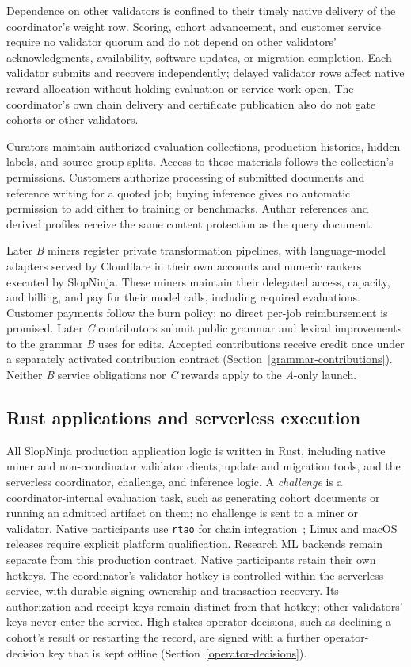 Dependence on other validators is confined to their timely native delivery of
the coordinator's weight row. Scoring, cohort advancement, and customer service require no validator
quorum and do not depend on other validators' acknowledgments, availability,
software updates, or migration completion. Each validator submits and recovers
independently; delayed validator rows affect native reward allocation
without holding evaluation or service work open. The coordinator's own chain
delivery and certificate publication also do not gate cohorts or other validators.

Curators maintain authorized evaluation collections, production histories,
hidden labels, and source-group splits. Access to these materials follows the
collection's permissions. Customers authorize processing of submitted documents
and reference writing for a quoted job; buying inference gives no automatic
permission to add either to training or benchmarks. Author references and
derived profiles receive the same content protection as the query document.

Later \textit{B} miners register private transformation pipelines, with
language-model adapters served by Cloudflare in their own accounts and numeric
rankers executed by SlopNinja. These miners maintain their delegated access,
capacity, and billing, and pay for their model calls, including required
evaluations. Customer payments follow the burn policy; no direct per-job
reimbursement is promised. Later \textit{C} contributors submit public grammar
and lexical improvements to the grammar \textit{B} uses for edits. Accepted
contributions receive credit once under a separately activated contribution
contract (Section~\ref{grammar-contributions}). Neither \textit{B} service obligations nor \textit{C} rewards apply to the
\textit{A}-only launch.

\subsection{Rust applications and serverless execution}

All SlopNinja production application logic is written in Rust, including
native miner and non-coordinator validator clients, update and migration tools,
and the serverless coordinator, challenge, and inference logic. A \emph{challenge}
is a coordinator-internal evaluation task, such as generating cohort documents
or running an admitted artifact on them; no challenge is sent to a miner or
validator. Native participants use
\texttt{rtao} for chain integration~\cite{rtao}; Linux and macOS releases require
explicit platform qualification. Research ML backends remain separate from
this production contract. Native participants retain their own hotkeys.
The coordinator's validator hotkey is controlled within the serverless service,
with durable signing ownership and transaction recovery. Its authorization and
receipt keys remain distinct from that hotkey; other validators' keys never
enter the service. High-stakes operator decisions, such as declining a cohort's result
or restarting the record, are signed with a further operator-decision key that
is kept offline (Section~\ref{operator-decisions}).

